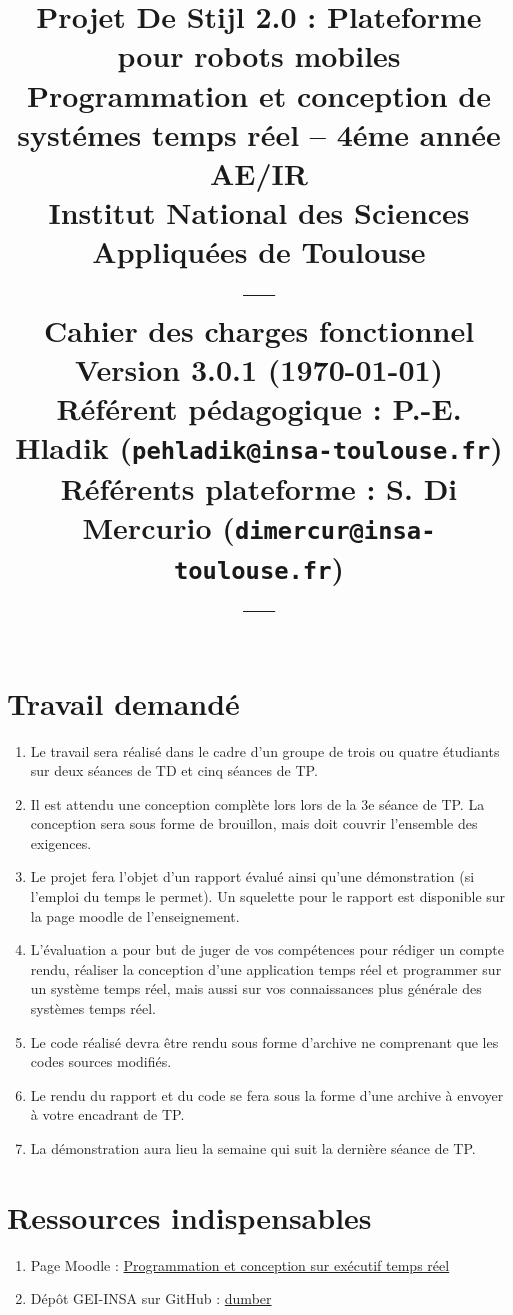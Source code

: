 \documentclass[11pt]{paper}
\title{{\Huge Projet De Stijl 2.0}
{\small : Plateforme pour robots mobiles}\\
{\scriptsize Programmation et conception de systémes temps réel -- 4éme année AE/IR}\\
{\scriptsize Institut National des Sciences Appliquées de Toulouse}\\
---\\
Cahier des charges fonctionnel \\
{\large Version 3.0.1 (\today)}\\
{\scriptsize Référent pédagogique : P.-E. Hladik (\texttt{pehladik@insa-toulouse.fr})}\\
{\scriptsize Référents plateforme : S. Di Mercurio (\texttt{dimercur@insa-toulouse.fr})}\\
---
}
\begin{document}
\maketitle


\section*{Travail demandé}

\begin{enumerate}
	\item Le travail sera réalisé dans le cadre d'un groupe de trois ou quatre étudiants sur deux séances de TD et cinq séances de TP.
	\item Il est attendu une conception complète lors lors de la 3e séance de TP. La conception sera sous forme de brouillon, mais doit couvrir l'ensemble des exigences.
	\item Le projet fera l'objet d'un rapport évalué ainsi qu'une démonstration (si l'emploi du temps le permet). Un squelette pour le rapport est disponible sur la page moodle de l'enseignement.
	\item L'évaluation a pour but de juger de vos compétences pour rédiger un compte rendu, réaliser la conception d'une application temps réel et programmer sur un système temps réel, mais aussi sur vos connaissances plus générale des systèmes temps réel.
	\item Le code réalisé devra être rendu sous forme d'archive ne comprenant que les codes sources modifiés.
	\item Le rendu du rapport et du code se fera sous la forme d'une archive à envoyer à votre encadrant de TP.
	\item La démonstration aura lieu la semaine qui suit la dernière séance de TP.
\end{enumerate}

\section*{Ressources indispensables}
\begin{enumerate}
	\item Page Moodle : \href{https://moodle.insa-toulouse.fr/course/view.php?id=235}{Programmation et conception sur exécutif temps réel}
	\item Dépôt GEI-INSA sur GitHub : \href{https://github.com/INSA-GEI/dumber/}{dumber}
\end{enumerate}

\newpage


\newpage


\newpage

\end{document}
